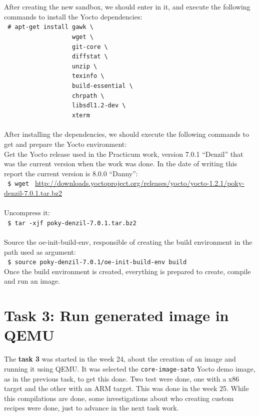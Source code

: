 \documentclass[a4paper,11pt,openany]{report}
\begin{document}
After creating the new sandbox, we should enter in it, and execute the following commands to install the Yocto dependencies:\\
\verb$ # apt-get install gawk \ $\\
\verb$                   wget \ $\\
\verb$                   git-core \ $\\ 
\verb$                   diffstat \ $\\
\verb$                   unzip \ $\\
\verb$                   texinfo \ $\\
\verb$                   build-essential \ $\\
\verb$                   chrpath \ $\\
\verb$                   libsdl1.2-dev \ $\\
\verb$                   xterm $\\
\\
After installing the dependencies, we should execute the following commands to get and prepare the Yocto environment:\\
Get the Yocto release used in the Practicum work, version 7.0.1 ``Denzil'' that was the current version when the work was done. In the date of writing this report the current version is 8.0.0 ``Danny'':\\
\verb# $ wget # \url{http://downloads.yoctoproject.org/releases/yocto/yocto-1.2.1/poky-denzil-7.0.1.tar.bz2}\\
\\
Uncompress it:\\
\verb# $ tar -xjf poky-denzil-7.0.1.tar.bz2 #\\
\\
Source the oe-init-build-env, responsible of creating the build environment in the path used as argument:\\
\verb# $ source poky-denzil-7.0.1/oe-init-build-env build #\\

Once the build environment is created, everything is prepared to create, compile and run an image.

\section{Task 3: Run generated image in QEMU}
The \textbf{task 3} was started in the week 24, about the creation of an image and running it using QEMU. It was selected the \verb#core-image-sato# Yocto demo image, as in the previous task, to get this done. Two test were done, one with a x86 target and the other with an ARM target. This was done in the week 25. While this compilations are done, some investigations about who creating custom recipes were done, just to advance in the next task work.
\end{document}
